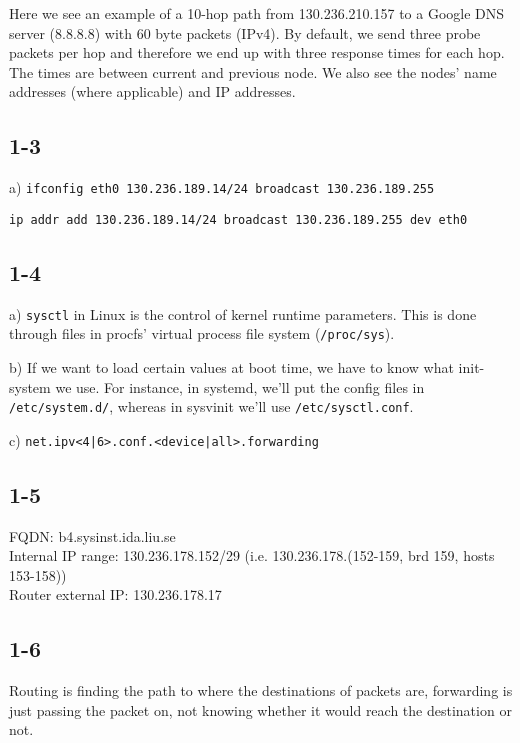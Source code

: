 Here we see an example of a 10-hop path from 130.236.210.157 to a Google DNS server (8.8.8.8) with 60 byte packets (IPv4). By default, we send three probe packets per hop and therefore we end up with three response times for each hop. The times are between current and previous node. We also see the nodes' name addresses (where applicable) and IP addresses.

\subsection{1-3}
a)
\verb=ifconfig eth0 130.236.189.14/24 broadcast 130.236.189.255=

\verb=ip addr add 130.236.189.14/24 broadcast 130.236.189.255 dev eth0=

\subsection{1-4}
a) \verb=sysctl= in Linux is the control of kernel runtime parameters. This is done through files in procfs' virtual process file system (\verb=/proc/sys=).

b) If we want to load certain values at boot time, we have to know what init-system we use. For instance, in systemd, we'll put the config files in \verb=/etc/system.d/=, whereas in sysvinit we'll use \verb=/etc/sysctl.conf=.

c) \verb=net.ipv<4|6>.conf.<device|all>.forwarding=

\subsection{1-5}
FQDN: b4.sysinst.ida.liu.se\\
Internal IP range: 130.236.178.152/29 (i.e. 130.236.178.(152-159, brd 159, hosts 153-158))\\
Router external IP: 130.236.178.17

\subsection{1-6}
Routing is finding the path to where the destinations of packets are, forwarding is just passing the packet on, not knowing whether it would reach the destination or not.

